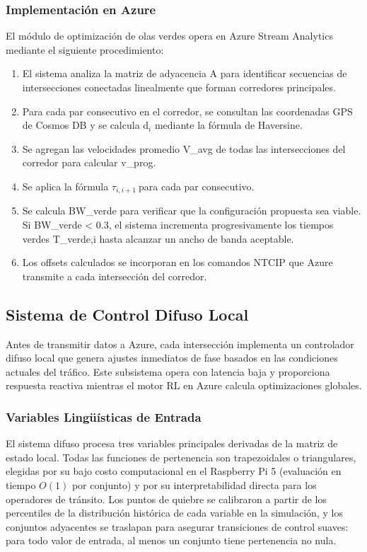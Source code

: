 \documentclass[12pt,a4paper,oneside]{report}
\begin{document}
\subsubsection{Implementación en Azure}

El módulo de optimización de olas verdes opera en Azure Stream Analytics mediante el siguiente procedimiento:

\begin{enumerate}
\def\labelenumi{\arabic{enumi}.}
\item
  El sistema analiza la matriz de adyacencia A para identificar secuencias de intersecciones conectadas linealmente que forman corredores principales.
\item
  Para cada par consecutivo en el corredor, se consultan las coordenadas GPS de Cosmos DB y se calcula d\ensuremath{_{i}} mediante la fórmula de Haversine.
\item
  Se agregan las velocidades promedio V\_avg de todas las intersecciones del corredor para calcular v\_prog.
\item
  Se aplica la fórmula \(\tau_{i,i + 1}\ \)para cada par consecutivo.
\item
  Se calcula BW\_verde para verificar que la configuración propuesta sea viable. Si BW\_verde \textless{} 0.3, el sistema incrementa progresivamente los tiempos verdes T\_verde,i hasta alcanzar un ancho de banda aceptable.
\item
  Los offsets calculados se incorporan en los comandos NTCIP que Azure transmite a cada intersección del corredor.
\end{enumerate}

\subsection{Sistema de Control Difuso Local}\label{sistema-de-control-difuso-local}

Antes de transmitir datos a Azure, cada intersección implementa un controlador difuso local que genera ajustes inmediatos de fase basados en las condiciones actuales del tráfico. Este subsistema opera con latencia baja y proporciona respuesta reactiva mientras el motor RL en Azure calcula optimizaciones globales.

\subsubsection{Variables Lingüísticas de Entrada}

El sistema difuso procesa tres variables principales derivadas de la matriz de estado local. Todas las funciones de pertenencia son trapezoidales o triangulares, elegidas por su bajo costo computacional en el Raspberry Pi 5 (evaluación en tiempo \(O(1)\) por conjunto) y por su interpretabilidad directa para los operadores de tránsito. Los puntos de quiebre se calibraron a partir de los percentiles de la distribución histórica de cada variable en la simulación, y los conjuntos adyacentes se traslapan para asegurar transiciones de control suaves: para todo valor de entrada, al menos un conjunto tiene pertenencia no nula.
\end{document}
